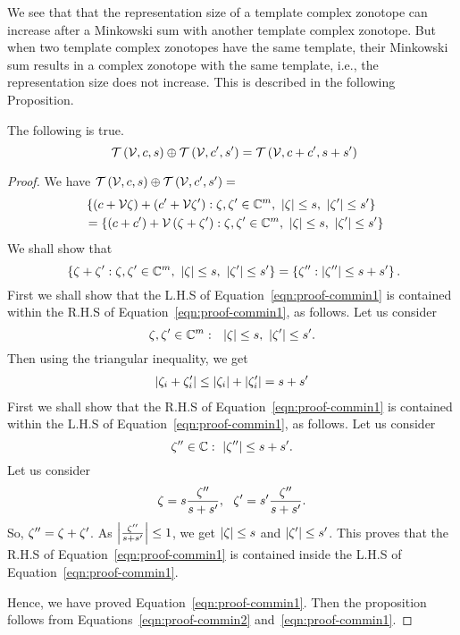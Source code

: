 %
We see that that the representation size of a template complex
zonotope can increase after a Minkowski sum with another template
complex zonotope.  But when two template complex
zonotopes have the same template, their Minkowski sum results in a
complex zonotope with the same template, i.e., the representation size
does not increase.  This is described in the following Proposition.
%
\begin{proposition}
The following is true.
%
\begin{equation}~\label{eqn:common-minkowski}
\mathit{\operatorname{\mathcal{T}}}\left(\mathcal{V},c,s\right)\oplus \mathit{\operatorname{\mathcal{T}}}\left(\mathcal{V},c^\prime,s^\prime\right)=\mathit{\operatorname{\mathcal{T}}}\left(\mathcal{V},c+c^\prime,s+s^\prime\right)
\end{equation}
%
\end{proposition}
%
\begin{proof}
We have $\mathit{\operatorname{\mathcal{T}}}\left(\mathcal{V},c,s\right)\oplus \mathit{\operatorname{\mathcal{T}}}\left(\mathcal{V},c^\prime,s^\prime\right)=$
%
\begin{align}~\label{eqn:proof-commin2}
&
\left\{\left(c+\mathcal{V}\zeta\right)+\left(c^\prime+\mathcal{V}\zeta^\prime\right):\zeta,\zeta^\prime\in\mathbb{C}^m,~\left|\zeta\right|\leq
s,~\left|\zeta^\prime\right|\leq s^\prime\right\}\nonumber\\
& = \left\{\left(c+c^\prime\right)+\mathcal{V}\left(\zeta+\zeta^\prime\right):\zeta,\zeta^\prime\in\mathbb{C}^m,~\left|\zeta\right|\leq
s,~\left|\zeta^\prime\right|\leq s^\prime\right\}
\end{align}
%
We shall show that
\begin{equation}~\label{eqn:proof-commin1}
\left\{\zeta+\zeta^\prime:\zeta,\zeta^\prime\in\mathbb{C}^m,~\left|\zeta\right|\leq
s,~\left|\zeta^\prime\right|\leq s^\prime\right\}=\left\{\zeta^{\prime\prime}:\left|\zeta^{\prime\prime}\right|\leq s+s^\prime \right\}.
\end{equation}
%
First we shall show that the L.H.S of Equation~\ref{eqn:proof-commin1} is
contained within the R.H.S of Equation~\ref{eqn:proof-commin1}, as follows.  Let
us consider
%
\[
\zeta,\zeta^\prime\in\mathbb{C}^m:~~\left|\zeta\right|\leq
s,~\left|\zeta^\prime\right|\leq s^\prime.
\]
%
Then using the triangular inequality, we get
%
\begin{align*}
\left|\zeta_i+\zeta^\prime_i\right|\leq
\left|\zeta_i\right|+\left|\zeta^\prime_i\right|=s+s^\prime
\end{align*}
%
First we shall show that the R.H.S of Equation~\ref{eqn:proof-commin1} is
contained within the L.H.S of Equation~\ref{eqn:proof-commin1}, as follows.  
Let us consider
%
\[
\zeta^{\prime\prime}\in\mathbb{C}:~\left|\zeta^{\prime\prime}\right|\leq s+s^\prime.
\]
%
Let us consider
%
\[
\zeta=s\frac{\zeta^{\prime\prime}}{s+s^\prime},~~\zeta^\prime=s^\prime\frac{\zeta^{\prime\prime}}{s+s^\prime}.
\]
%
So, $\zeta^{\prime\prime}=\zeta+\zeta^\prime$.  As
$\left|\frac{\zeta^{\prime\prime}}{s+s^\prime}\right|\leq 1$, we get
$\left|\zeta\right|\leq s$ and
$\left|\zeta^\prime\right|\leq s^\prime$.  This proves that
the R.H.S of Equation~\ref{eqn:proof-commin1} is contained inside the
L.H.S of Equation~\ref{eqn:proof-commin1}.

Hence, we have proved Equation~\ref{eqn:proof-commin1}.  Then the
proposition follows from
Equations~\ref{eqn:proof-commin2} and~\ref{eqn:proof-commin1}.
\end{proof}
